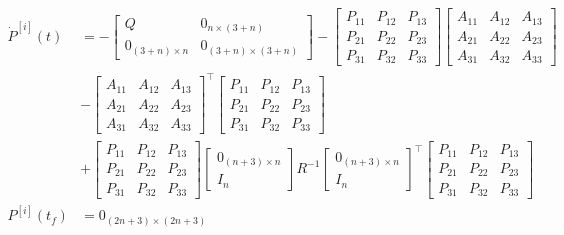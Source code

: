 \documentclass[3p,times]{article}
\begin{document}
\begin{align}
\dot{P}^{[i]}(t) &= -\begin{bmatrix}
Q & 0_{n\times (3+n)} \\ 0_{(3+n)\times n} & 0_{(3+n)\times (3+n)}
\end{bmatrix}- \begin{bmatrix}
P_{11} & P_{12} & P_{13} \\
P_{21} & P_{22} & P_{23} \\
P_{31} & P_{32} & P_{33}
\end{bmatrix}\begin{bmatrix}
A_{11} & A_{12} & A_{13}\\ A_{21} & A_{22} & A_{23} \\
A_{31} & A_{32} & A_{33}
\end{bmatrix} \\
&-\begin{bmatrix}
A_{11} & A_{12} & A_{13}\\ A_{21} & A_{22} & A_{23} \\
A_{31} & A_{32} & A_{33}
\end{bmatrix}^\top \begin{bmatrix}
P_{11} & P_{12} & P_{13} \\
P_{21} & P_{22} & P_{23} \\
P_{31} & P_{32} & P_{33}
\end{bmatrix} \\ &+\begin{bmatrix}
P_{11} & P_{12} & P_{13} \\
P_{21} & P_{22} & P_{23} \\
P_{31} & P_{32} & P_{33}
\end{bmatrix}\begin{bmatrix} 
0_{(n+3)\times n} \\
I_n
\end{bmatrix}  R^{-1} \begin{bmatrix} 
0_{(n+3)\times n} \\
I_n
\end{bmatrix}^{\top} \begin{bmatrix}
P_{11} & P_{12} & P_{13} \\
P_{21} & P_{22} & P_{23} \\
P_{31} & P_{32} & P_{33}
\end{bmatrix} \\
P^{[i]}(t_f) &= 0_{(2n+3)\times(2n+3)}
\end{align}
\end{document}
